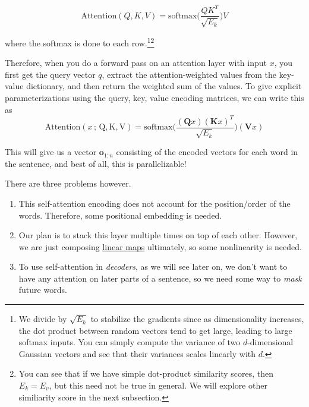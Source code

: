 \begin{definition}
      \begin{equation} 
        \mathrm{Attention}(Q, K, V) = \mathrm{softmax} \bigg( \frac{Q K^T}{\sqrt{E_k}} \bigg) V
      \end{equation}

      where the softmax is done to each row.\footnote{We divide by $\sqrt{E_k}$ to stabilize the gradients since as dimensionality increases, the dot product between random vectors tend to get large, leading to large softmax inputs. You can simply compute the variance of two $d$-dimensional Gaussian vectors and see that their variances scales linearly with $d$. }\footnote{You can see that if we have simple dot-product similarity scores, then $E_k = E_v$, but this need not be true in general. We will explore other similiarity score in the next subsection. } 

      Therefore, when you do a forward pass on an attention layer with input $x$, you first get the query vector $q$, extract the attention-weighted values from the key-value dictionary, and then return the weighted sum of the values. To give explicit parameterizations using the query, key, value encoding matrices, we can write this as 
      \begin{equation} 
        \mathrm{Attention}(x \,;\, \mathrm{Q}, \mathrm{K}, \mathrm{V}) = \mathrm{softmax} \bigg( \frac{(\mathbf{Q}x)(\mathbf{K} x)^T}{\sqrt{E_k}} \bigg) (\mathbf{V} x)
      \end{equation}

      This will give us a vector $\mathbf{o}_{1:n}$ consisting of the encoded vectors for each word in the sentence, and best of all, this is parallelizable! 
    \end{definition}

    There are three problems however. 
    \begin{enumerate}
      \item This self-attention encoding does not account for the position/order of the words. Therefore, some positional embedding is needed. 
      \item Our plan is to stack this layer multiple times on top of each other. However, we are just composing \hyperref[lin-def:linear_map]{linear maps} ultimately, so some nonlinearity is needed. 
      \item To use self-attention in \textit{decoders}, as we will see later on, we don't want to have any attention on later parts of a sentence, so we need some way to \textit{mask} future words. 
    \end{enumerate}


